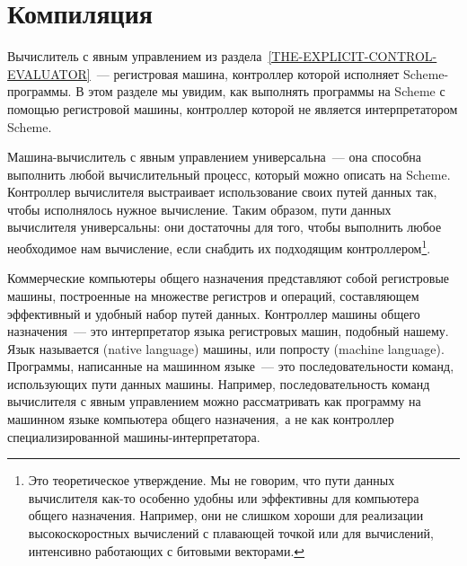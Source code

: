 \section{Компиляция}
\label{COMPILATION}


%
Вычислитель с явным управлением из 
раздела~\ref{THE-EXPLICIT-CONTROL-EVALUATOR}~---  регистровая
машина, контроллер которой исполняет Scheme-программы.  В этом
разделе мы увидим, как выполнять программы на Scheme с помощью
регистровой машины, контроллер которой не является интерпретатором
Scheme.

  Машина-вычислитель с явным управлением универсальна~--- она
способна выполнить любой вычислительный процесс, который можно описать на
Scheme.  Контроллер вычислителя выстраивает использование своих путей
данных так, чтобы исполнялось нужное вычисление.  Таким образом, пути
данных вычислителя универсальны: они достаточны для того, чтобы
выполнить любое необходимое нам вычисление, если снабдить их
подходящим контроллером\footnote{Это теоретическое утверждение.  Мы не говорим, что пути
данных вычислителя как-то особенно удобны или эффективны для
компьютера общего назначения.  Например, они не слишком хороши для
реализации высокоскоростных вычислений с плавающей точкой или для
вычислений, интенсивно работающих с битовыми векторами.
}.

Коммерческие 
компьютеры общего назначения
представляют собой регистровые машины, построенные на множестве
регистров и операций, составляющем эффективный и удобный набор путей
данных.  Контроллер машины общего назначения~--- это интерпретатор
языка регистровых машин, подобный нашему.  Язык называется  
 (native language) машины, или попросту 
 (machine language).
Программы, написанные на машинном языке~--- это последовательности
команд, использующих пути данных машины.  Например, последовательность
команд вычислителя с явным управлением можно рассматривать как
программу на машинном языке компьютера общего назначения,~а не как
контроллер специализированной машины-интерпретатора.

